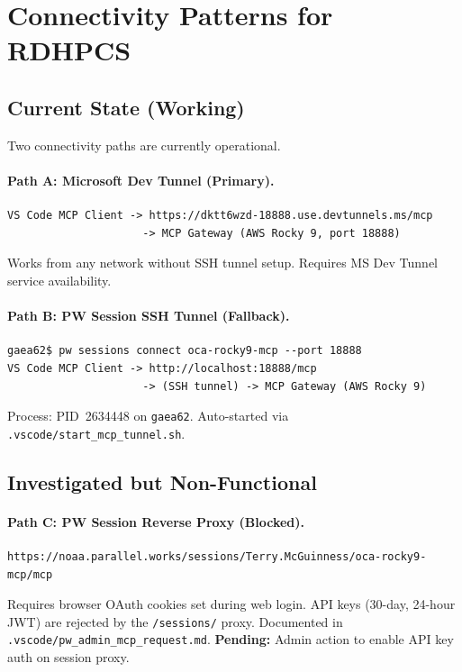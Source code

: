 \documentclass[11pt,letterpaper,twoside]{article}
\begin{document}
\section{Connectivity Patterns for RDHPCS}
\label{sec:connectivity}

\subsection{Current State (Working)}

Two connectivity paths are currently operational.

\paragraph{Path A: Microsoft Dev Tunnel (Primary).}
\begin{lstlisting}[style=diagram]
VS Code MCP Client -> https://dktt6wzd-18888.use.devtunnels.ms/mcp
                     -> MCP Gateway (AWS Rocky 9, port 18888)
\end{lstlisting}
Works from any network without SSH tunnel setup. Requires MS Dev Tunnel
service availability.

\paragraph{Path B: PW Session SSH Tunnel (Fallback).}
\begin{lstlisting}[style=diagram]
gaea62$ pw sessions connect oca-rocky9-mcp --port 18888
VS Code MCP Client -> http://localhost:18888/mcp
                     -> (SSH tunnel) -> MCP Gateway (AWS Rocky 9)
\end{lstlisting}
Process: PID~2634448 on \texttt{gaea62}. Auto-started via
\texttt{.vscode/start\_mcp\_tunnel.sh}.

\subsection{Investigated but Non-Functional}

\paragraph{Path C: PW Session Reverse Proxy (Blocked).}
\begin{lstlisting}[style=diagram]
https://noaa.parallel.works/sessions/Terry.McGuinness/oca-rocky9-mcp/mcp
\end{lstlisting}
Requires browser OAuth cookies set during web login. API keys
(30-day, 24-hour JWT) are rejected by the \texttt{/sessions/} proxy.
Documented in \texttt{.vscode/pw\_admin\_mcp\_request.md}.
\textbf{Pending:} Admin action to enable API key auth on session proxy.
\end{document}
